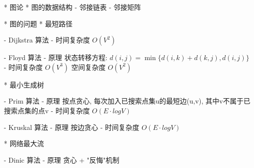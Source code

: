 * 图论
	* 图的数据结构
		- 邻接链表
		- 邻接矩阵

	* 图的问题
		* 最短路径
			\Problem

			\Algorithm
				- Dijkstra 算法
					- 时间复杂度 $O(V^2)$

				- Floyd 算法
					- 原理
						状态转移方程:
						$d(i,j) = \min\{ d(i,k) + d(k,j) , d(i,j) \}$
					- 时间复杂度 $O(V^3)$
						空间复杂度 $O(V^2)$

		* 最小生成树
			\Problem

			\Algorithm
				- Prim 算法
					- 原理	
						按点贪心, 每次加入已搜索点集u的最短边(u,v), 其中v不属于已搜索点集的点v
					- 时间复杂度 $O(E·logV)$

				- Kruskal 算法
					- 原理
						按边贪心
					- 时间复杂度 $O(E·logV)$
					
		* 网络最大流
			\Problem

			\Algorithm
				- Dinic 算法
					- 原理
						贪心 + "反悔"机制